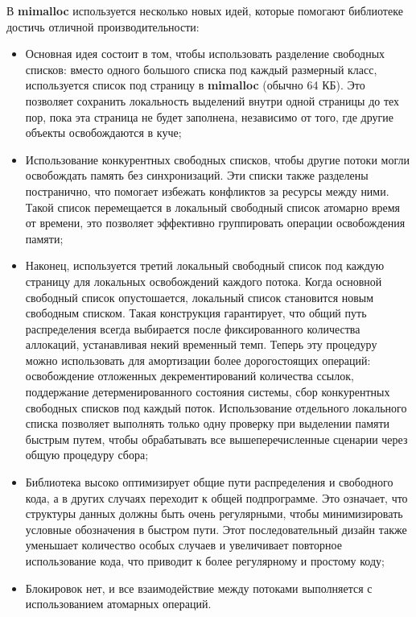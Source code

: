 В \textbf{mimalloc} используется несколько новых идей, которые помогают библиотеке достичь отличной производительности:
\begin{itemize}
	\item Основная идея состоит в том, чтобы использовать разделение свободных списков: вместо одного большого списка под каждый размерный класс, используется список под страницу в \textbf{mimalloc} (обычно 64 КБ). Это позволяет сохранить локальность выделений внутри одной страницы до тех пор, пока эта страница не будет заполнена, независимо от того, где другие объекты освобождаются в куче;
	\item Использование конкурентных свободных списков, чтобы другие потоки могли освобождать память без синхронизаций. Эти списки также разделены постранично, что помогает избежать конфликтов за ресурсы между ними. Такой список перемещается в локальный свободный список атомарно время от времени, это позволяет эффективно группировать операции освобождения памяти;
	\item Наконец, используется третий локальный свободный список под каждую страницу для локальных освобождений каждого потока. Когда основной свободный список опустошается, локальный список становится новым свободным списком. Такая конструкция гарантирует, что общий путь распределения всегда выбирается после фиксированного количества аллокаций, устанавливая некий временный темп. Теперь эту процедуру можно использовать для амортизации более дорогостоящих операций: освобождение отложенных декрементирований количества ссылок, поддержание детерменированного состояния системы, сбор конкурентных свободных списков под каждый поток. Использование отдельного локального списка позволяет выполнять только одну проверку при выделении памяти быстрым путем, чтобы обрабатывать все вышеперечисленные сценарии через общую процедуру сбора;
	\item Библиотека высоко оптимизирует общие пути распределения и свободного кода, а в других случаях переходит к общей подпрограмме. Это означает, что структуры данных должны быть очень регулярными, чтобы минимизировать условные обозначения в быстром пути. Этот последовательный дизайн также уменьшает количество особых случаев и увеличивает повторное использование кода, что приводит к более регулярному и простому коду;
	\item Блокировок нет, и все взаимодействие между потоками выполняется с использованием атомарных операций.
\end{itemize}

